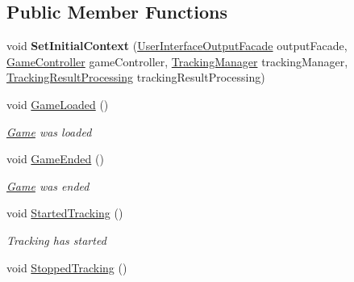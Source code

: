 \subsection*{Public Member Functions}
\begin{DoxyCompactItemize}
\item 
\mbox{\label{class_chess_tracking_1_1_controlling_elements_1_1_program_state_1_1_program_state_controller_a001cfadc41729cc245a2eef768dc5bd0}} 
void {\bfseries Set\+Initial\+Context} (\mbox{\hyperlink{class_chess_tracking_1_1_user_interface_1_1_user_interface_output_facade}{User\+Interface\+Output\+Facade}} output\+Facade, \mbox{\hyperlink{class_chess_tracking_1_1_game_1_1_game_controller}{Game\+Controller}} game\+Controller, \mbox{\hyperlink{class_chess_tracking_1_1_controlling_elements_1_1_tracking_manager}{Tracking\+Manager}} tracking\+Manager, \mbox{\hyperlink{class_chess_tracking_1_1_controlling_elements_1_1_tracking_result_processing}{Tracking\+Result\+Processing}} tracking\+Result\+Processing)
\item 
void \mbox{\hyperlink{class_chess_tracking_1_1_controlling_elements_1_1_program_state_1_1_program_state_controller_a48d65a925eb5a5f38a874e486a4477e2}{Game\+Loaded}} ()
\begin{DoxyCompactList}\small\item\em \mbox{\hyperlink{namespace_chess_tracking_1_1_game}{Game}} was loaded \end{DoxyCompactList}\item 
void \mbox{\hyperlink{class_chess_tracking_1_1_controlling_elements_1_1_program_state_1_1_program_state_controller_a78fc127e221dc85207312df1a5753268}{Game\+Ended}} ()
\begin{DoxyCompactList}\small\item\em \mbox{\hyperlink{namespace_chess_tracking_1_1_game}{Game}} was ended \end{DoxyCompactList}\item 
void \mbox{\hyperlink{class_chess_tracking_1_1_controlling_elements_1_1_program_state_1_1_program_state_controller_afd555f69a318ca50b76a7bd275daa904}{Started\+Tracking}} ()
\begin{DoxyCompactList}\small\item\em Tracking has started \end{DoxyCompactList}\item 
void \mbox{\hyperlink{class_chess_tracking_1_1_controlling_elements_1_1_program_state_1_1_program_state_controller_a565a98e53eef118e055172bca8672fae}{Stopped\+Tracking}} ()

\end{DoxyCompactItemize}
